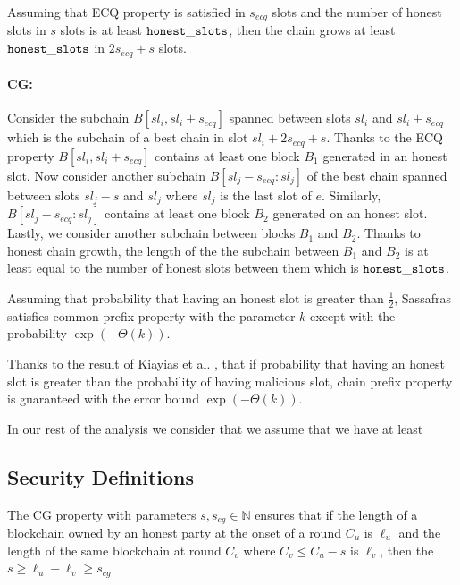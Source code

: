 	
	
\begin{lemma}[CG]
	Assuming that ECQ property is satisfied in $ s_{ecq} $ slots and the number of honest slots in $ s $ slots is at least $ \mathtt{honest\_slots} $, then the chain grows at least $ \mathtt{honest\_slots} $ in $ 2s_{ecq} + s $ slots.
\end{lemma}
	\paragraph{CG:} Consider the subchain $ B[sl_i,sl_i+s_{ecq}] $ spanned between slots $ sl_i $ and $ sl_i + s_{ecq} $  which is the subchain of a best chain in slot $ sl_i +  2s_{ecq} + s  $. Thanks to the ECQ property $ B[sl_i,sl_i+s_{ecq}] $ contains at least one block $ B_1 $ generated in an honest slot.   Now consider another subchain $ B[sl_j -s_{ecq} :sl_j] $ of the best chain spanned between slots $ sl_j - s $ and $ sl_j $ where $ sl_j $  is the last slot of $ e $. Similarly, $ B[sl_j -s_{ecq} :sl_j] $ contains at least one block $ B_2 $ generated on an honest slot. Lastly, we consider another subchain between blocks $ B_1 $ and $ B_2 $.  Thanks to honest chain growth, the length of the the subchain between $ B_1 $ and $ B_2 $ is at least equal to the number of honest slots between them which is $ \mathtt{honest\_slots} $. 
	
	
\begin{lemma}[CP]
	Assuming that probability that having an honest slot is greater than $ \frac{1}{2} $, Sassafras satisfies common prefix property  with the parameter $ k $ except with the probability  $ \exp(-\Theta(k)) $. 
\end{lemma}
	
	
Thanks to the result of  Kiayias et al. \cite{consistency}, that if probability that having an honest slot is greater than the probability of having malicious slot, chain prefix property is guaranteed with the error bound $ \exp(-\Theta(k)) $. 


In our rest of the analysis we consider that we assume that we have at least $  $

\subsection{Security Definitions}

\begin{definition} \label{def:cg}
	The CG  property with parameters $ s, s_{cg}\in \mathbb{N} $ ensures that if the length of a blockchain owned by an honest party at the onset of a round $ C_u $ is $ \ell_u $ and the length of the same blockchain at round $ C_v  $ where $ C_v \leq C_u - s  $ is $\ell_v$, then the $ s \geq \ell_u  - \ell_v \geq  s_{cg} $.
	
	
\end{definition}

